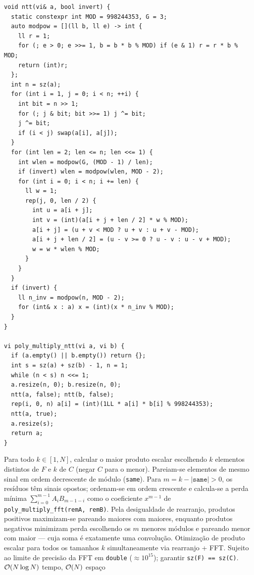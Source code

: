 \begin{lstlisting}
void ntt(vi& a, bool invert) {
  static constexpr int MOD = 998244353, G = 3;
  auto modpow = [](ll b, ll e) -> int {
    ll r = 1;
    for (; e > 0; e >>= 1, b = b * b % MOD) if (e & 1) r = r * b % MOD;
    return (int)r;
  };
  int n = sz(a);
  for (int i = 1, j = 0; i < n; ++i) {
    int bit = n >> 1;
    for (; j & bit; bit >>= 1) j ^= bit;
    j ^= bit;
    if (i < j) swap(a[i], a[j]);
  }
  for (int len = 2; len <= n; len <<= 1) {
    int wlen = modpow(G, (MOD - 1) / len);
    if (invert) wlen = modpow(wlen, MOD - 2);
    for (int i = 0; i < n; i += len) {
      ll w = 1;
      rep(j, 0, len / 2) {
        int u = a[i + j];
        int v = (int)(a[i + j + len / 2] * w % MOD);
        a[i + j] = (u + v < MOD ? u + v : u + v - MOD);
        a[i + j + len / 2] = (u - v >= 0 ? u - v : u - v + MOD);
        w = w * wlen % MOD;
      }
    }
  }
  if (invert) {
    ll n_inv = modpow(n, MOD - 2);
    for (int& x : a) x = (int)(x * n_inv % MOD);
  }
}

vi poly_multiply_ntt(vi a, vi b) {
  if (a.empty() || b.empty()) return {};
  int s = sz(a) + sz(b) - 1, n = 1;
  while (n < s) n <<= 1;
  a.resize(n, 0); b.resize(n, 0);
  ntt(a, false); ntt(b, false);
  rep(i, 0, n) a[i] = (int)(1LL * a[i] * b[i] % 998244353);
  ntt(a, true);
  a.resize(s);
  return a;
}
\end{lstlisting}

\algobox
  {Para todo $k \in [1, N]$, calcular o maior produto escalar escolhendo $k$ elementos distintos de $F$ e $k$ de $C$ (negar $C$ para o menor).}
  {Pareiam-se elementos de mesmo sinal em ordem decrescente de módulo (\texttt{same}). Para $m = k - |\texttt{same}| > 0$, os resíduos têm sinais opostos; ordenam-se em ordem crescente e calcula-se a perda mínima $\sum_{i=0}^{m-1} A_i B_{m-1-i}$ como o coeficiente $x^{m-1}$ de \texttt{poly\_multiply\_fft(remA, remB)}.}
  {Pela desigualdade de rearranjo, produtos positivos maximizam-se pareando maiores com maiores, enquanto produtos negativos minimizam perda escolhendo os $m$ menores módulos e pareando menor com maior — cuja soma é exatamente uma convolução.}
  {Otimização de produto escalar para todos os tamanhos $k$ simultaneamente via rearranjo + FFT.}
  {Sujeito ao limite de precisão da FFT em \texttt{double} ($\approx 10^{15}$); garantir \texttt{sz(F) == sz(C)}.}
  {$\mathcal{O}(N \log N)$ tempo, $\mathcal{O}(N)$ espaço}

